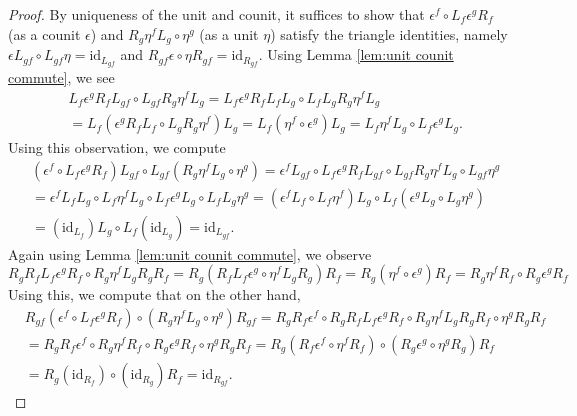 \documentclass{article}
\newcommand{\id}{\mathrm{id}}
\begin{document}
    \begin{proof}
        By uniqueness of the unit and counit, it suffices to show that $\epsilon^f\circ L_f \epsilon^g R_f$ (as a counit $\epsilon$)  and $R_g \eta^f L_g \circ \eta^g$ (as a unit $\eta$) satisfy the triangle identities, namely $\epsilon L_{gf} \circ L_{gf} \eta = \id_{L_{gf}}$ and $R_{gf} \epsilon \circ \eta R_{gf} = \id_{R_{gf}}$. Using Lemma \ref{lem:unit counit commute}, we see
        \begin{align*}
            &L_f \epsilon^g R_f L_{gf}\circ L_{gf}R_g \eta^f L_g= L_f \epsilon^g R_f L_f L_g \circ L_f L_g R_g \eta^f L_g\\
            &=L_f(\epsilon^g R_f L_f \circ L_g R_g \eta^f)L_g = L_f(\eta^f \circ \epsilon^g) L_g=L_f \eta^f L_g \circ L_f \epsilon^g L_g.
        \end{align*}
        Using this observation, we compute
        \begin{align*}
            &(\epsilon^f\circ L_f \epsilon^g R_f) L_{gf} \circ L_{gf} (R_g \eta^f L_g \circ \eta^g)=\epsilon^fL_{gf}\circ L_f \epsilon^g R_f L_{gf} \circ L_{gf} R_g \eta^f L_g \circ L_{gf}\eta^g\\
            &=\epsilon^fL_{f}L_g\circ L_f \eta^f L_g \circ L_f \epsilon^g L_g \circ L_{f}L_g\eta^g=(\epsilon^f L_f \circ L_f \eta^f)L_g \circ L_f(\epsilon^gL_g \circ L_g \eta^g)\\
            &=(\id_{L_f})L_g\circ L_f(\id_{L_g})=\id_{L_{gf}}.
        \end{align*}
        Again using Lemma \ref{lem:unit counit commute}, we observe
        \[
         R_gR_f L_f \epsilon^g R_f \circ R_g \eta^fL_g R_g R_f = R_g(R_fL_f \epsilon^g\circ \eta^fL_g R_g)R_f=R_g(\eta^f \circ \epsilon^g)R_f=R_g \eta^f R_f \circ R_g \epsilon^g R_f
        \]
       Using this, we compute that on the other hand,
        \begin{align*}
            &R_{gf} (\epsilon^f \circ L_f \epsilon^g R_f)\circ (R_g \eta^f L_g \circ \eta^g)R_{gf}=R_gR_f \epsilon^f \circ R_gR_f L_f \epsilon^g R_f \circ R_g \eta^fL_g R_g R_f \circ \eta^g R_g R_f\\
            &=R_gR_f \epsilon^f \circ R_g \eta^f R_f \circ R_g \epsilon^g R_f \circ \eta^g R_g R_f=R_g(R_f \epsilon^f \circ \eta^f R_f) \circ (R_g \epsilon^g \circ \eta^g R_g)R_f\\
            &= R_g(\id_{R_f}) \circ (\id_{R_g})R_f = \id_{R_{gf}}.
        \end{align*}
    \end{proof}
\end{document}
